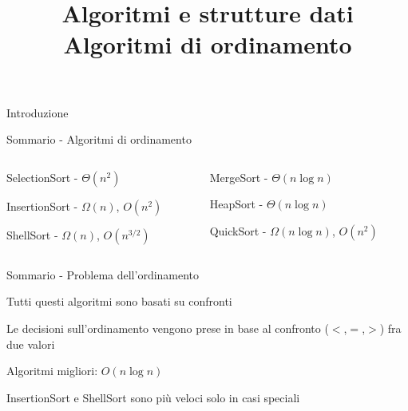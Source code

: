 

\graphicspath{{figs/A1/}}



\title[ASD - Algoritmi di ordinamento]{\textbf{Algoritmi e strutture dati}\\[24pt]Algoritmi di ordinamento}

\FrameTitle{}


\begin{frame}{Introduzione}

\begin{block}{Sommario - Algoritmi di ordinamento}
\begin{columns}
\begin{column}{0.48\textwidth}
\BI
\item SelectionSort - $\Theta(n^2)$
\item InsertionSort - $\Omega(n)$, $O(n^2)$
\item ShellSort - $\Omega(n)$, $O(n^{3/2})$
\EI
\end{column}
\begin{column}{0.48\textwidth} 
\BI
\item MergeSort - $\Theta(n \log n)$
\item HeapSort - $\Theta(n \log n)$
\item QuickSort - $\Omega(n \log n)$, $O(n^2)$
\EI
\end{column}
\end{columns}
\end{block}


\bigskip
\begin{block}{Sommario - Problema dell'ordinamento}
\BI
\item \alert{Tutti questi algoritmi sono basati su confronti}
\BI
\item Le decisioni sull'ordinamento vengono prese in base al confronto ($<$,$=$,$>$) fra due valori
\EI
\item \alert{Algoritmi migliori: $O(n \log n)$}
\BI
\item InsertionSort e ShellSort sono più veloci solo in casi speciali
\EI
\EI
\end{block}

\end{frame}



